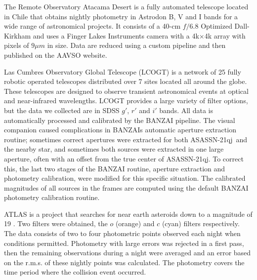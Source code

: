 \documentclass[sn-nature]{sn-jnl}%
\newcommand{\asas}{ASASSN-21qj}
\begin{document}

The Remote Observatory Atacama Desert \cite[ROAD; ][]{Hambsch12} is a fully automated telescope located in Chile that obtains nightly photometry in Astrodon B, V and I bands for a wide range of astronomical projects.
%
It consists of a 40-cm $f/6.8$ Optimized Dall-Kirkham and uses a Finger Lakes Instruments camera with a 4k$\times$4k array with pixels of $9\mu m$ in size.
%
Data are reduced using a custom pipeline and then published on the AAVSO website.


Las Cumbres Observatory Global Telescope (LCOGT) is a network of 25 fully robotic operated telescopes distributed over 7 sites located all around the globe.
%
These telescopes are designed to observe transient astronomical events at optical and near-infrared wavelengths.
%
LCOGT provides a large variety of filter options, but the data we collected are in SDSS $g'$, $r'$ and $i'$ bands.
%
All data is automatically processed and calibrated by the BANZAI pipeline.
%
The visual companion caused complications in BANZAIs automatic aperture extraction routine; sometimes correct apertures were extracted for both \asas\ and the nearby star, and sometimes both sources were extracted in one large aperture, often with an offset from the true center of \asas.
%
%
To correct this, the last two stages of the BANZAI routine, aperture extraction and photometry calibration, were modified for this specific situation. 
%
The calibrated magnitudes of all sources in the frames are computed using the default BANZAI photometry calibration routine.


ATLAS is a project that searches for near earth asteroids down to a magnitude of 19 \cite{Tonry18}.
%
Two filters were obtained, the $o$ (orange) and $c$ (cyan) filters respectively.
%
The data consists of two to four photometric points observed each night when conditions permitted.
%
Photometry with large errors was rejected in a first pass, then the remaining observations during a night were averaged and an error based on the r.m.s. of these nightly points was calculated.
%
The photometry covers the time period where the collision event occurred. 
\end{document}
